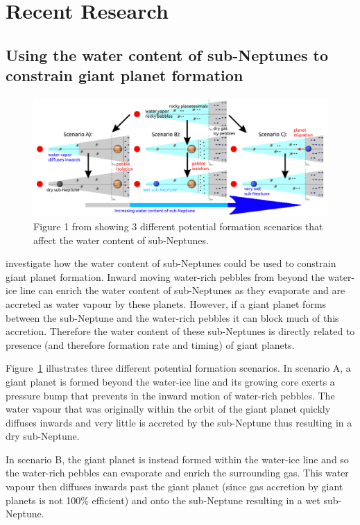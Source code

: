 \documentclass[twocolumn]{aastex631}
\begin{document}
\section{Recent Research}

\subsection{Using the water content of sub-Neptunes to constrain giant planet formation}

\begin{figure}
    \centering
    \includegraphics[width=\textwidth]{water_cartoon.png}
    \caption{Figure 1 from \citet{Bitsch+2021} showing 3 different potential formation scenarios that affect the water content of sub-Neptunes.}
    \label{fig:water}
\end{figure}

\citet{Bitsch+2021} investigate how the water content of sub-Neptunes could be used to constrain giant planet formation. Inward moving water-rich pebbles from beyond the water-ice line can enrich the water content of sub-Neptunes as they evaporate and are accreted as water vapour by these planets. However, if a giant planet forms between the sub-Neptune and the water-rich pebbles it can block much of this accretion. Therefore the water content of these sub-Neptunes is directly related to presence (and therefore formation rate and timing) of giant planets.

Figure~\ref{fig:water} illustrates three different potential formation scenarios. In scenario A, a giant planet is formed beyond the water-ice line and its growing core exerts a pressure bump that prevents in the inward motion of water-rich pebbles. The water vapour that was originally within the orbit of the giant planet quickly diffuses inwards and very little is accreted by the sub-Neptune thus resulting in a dry sub-Neptune.

In scenario B, the giant planet is instead formed within the water-ice line and so the water-rich pebbles can evaporate and enrich the surrounding gas. This water vapour then diffuses inwards past the giant planet (since gas accretion by giant planets is not 100\% efficient) and onto the sub-Neptune resulting in a wet sub-Neptune.
\end{document}
